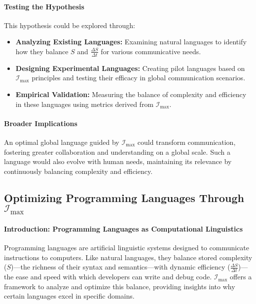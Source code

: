 \documentclass[12pt]{article}
\begin{document}
\paragraph{Testing the Hypothesis}
This hypothesis could be explored through:
\begin{itemize}
    \item \textbf{Analyzing Existing Languages:} Examining natural languages to identify how they balance \(S\) and \(\frac{\Delta S}{\Delta t}\) for various communicative needs.
    \item \textbf{Designing Experimental Languages:} Creating pilot languages based on \(\mathcal{I}_{\text{max}}\) principles and testing their efficacy in global communication scenarios.
    \item \textbf{Empirical Validation:} Measuring the balance of complexity and efficiency in these languages using metrics derived from \(\mathcal{I}_{\text{max}}\).
\end{itemize}

\paragraph{Broader Implications}
An optimal global language guided by \(\mathcal{I}_{\text{max}}\) could transform communication, fostering greater collaboration and understanding on a global scale. Such a language would also evolve with human needs, maintaining its relevance by continuously balancing complexity and efficiency.

\subsection{Optimizing Programming Languages Through \(\mathcal{I}_{\text{max}}\)}

\paragraph{Introduction: Programming Languages as Computational Linguistics}
Programming languages are artificial linguistic systems designed to communicate instructions to computers. Like natural languages, they balance stored complexity (\(S\))—the richness of their syntax and semantics—with dynamic efficiency (\(\frac{\Delta S}{\Delta t}\))—the ease and speed with which developers can write and debug code. \(\mathcal{I}_{\text{max}}\) offers a framework to analyze and optimize this balance, providing insights into why certain languages excel in specific domains.
\end{document}
